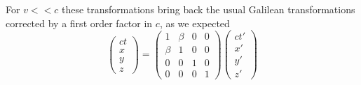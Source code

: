 \documentclass[../electromagnetism.tex]{subfiles}
\begin{document}
For $v<<c$ these transformations bring back the usual Galilean transformations corrected by a first order factor in $c$, as we expected
\begin{equation}
	\begin{pmatrix}
		ct\\x\\y\\z
	\end{pmatrix}=\begin{pmatrix}
		1&\beta&0&0\\
		\beta&1&0&0\\
		0&0&1&0\\
		0&0&0&1
	\end{pmatrix}
	\begin{pmatrix}
		ct'\\x'\\y'\\z'
	\end{pmatrix}
	\label{eq:approxlor}
\end{equation}
\end{document}
